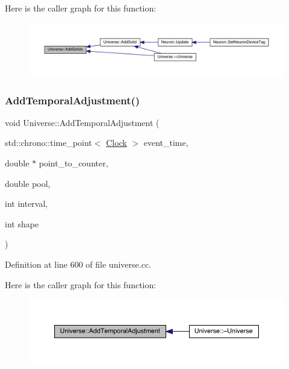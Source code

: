 Here is the caller graph for this function\+:
\nopagebreak
\begin{figure}[H]
\begin{center}
\leavevmode
\includegraphics[width=350pt]{class_universe_a410d5ba2224fe90584b1f1aa5b38b41c_icgraph}
\end{center}
\end{figure}
\mbox{\label{class_universe_a901e16db5e8af258c66af7ac75662fe0}} 
\subsubsection{\texorpdfstring{Add\+Temporal\+Adjustment()}{AddTemporalAdjustment()}}
{\footnotesize\ttfamily void Universe\+::\+Add\+Temporal\+Adjustment (\begin{DoxyParamCaption}\item[{std\+::chrono\+::time\+\_\+point$<$ \hyperlink{universe_8h_a0ef8d951d1ca5ab3cfaf7ab4c7a6fd80}{Clock} $>$}]{event\+\_\+time,  }\item[{double $\ast$}]{point\+\_\+to\+\_\+counter,  }\item[{double}]{pool,  }\item[{int}]{interval,  }\item[{int}]{shape }\end{DoxyParamCaption})\hspace{0.3cm}{\ttfamily [virtual]}}



Definition at line 600 of file universe.\+cc.

Here is the caller graph for this function\+:
\nopagebreak
\begin{figure}[H]
\begin{center}
\leavevmode
\includegraphics[width=350pt]{class_universe_a901e16db5e8af258c66af7ac75662fe0_icgraph}
\end{center}
\end{figure}
\mbox{\label{class_universe_a15aa20218286fd11ecb9b792dfb63be3}} 

